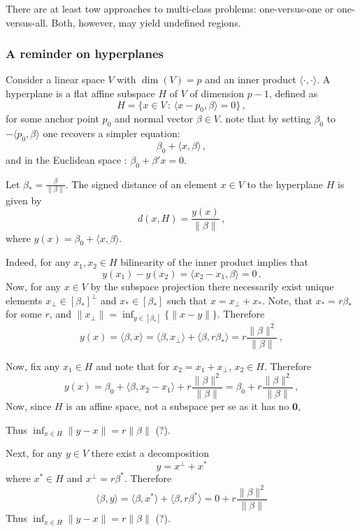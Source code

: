 \documentclass[a4paper]{article}
\begin{document}
There are at least tow approaches to multi-class problems: one-versus-one or one-
versus-all. Both, however, may yield undefined regions.

\subsubsection{A reminder on hyperplanes} %
\label{ssub:a_reminder_on_hyperplanes}
Consider a linear space $V$ with $\dim(V)=p$ and an inner product $\langle\cdot,\cdot\rangle$.
A hyperplane is a flat affine subspace $H$ of $V$ of dimension $p-1$, defined as
\[
H = \bigl\{x\in V\,:\, \langle x - p_0, \beta\rangle = 0 \bigr\}\,,
\]
for some anchor point $p_0$ and normal vector $\beta\in V$. note that by setting
$\beta_0$ to $-\langle p_0,\beta \rangle$ one recovers a simpler equation:
\[ \beta_0 + \langle x, \beta\rangle\,, \]
and in the Euclidean space : $\beta_0 + \beta'x = 0$.

Let $\beta_* = \frac{\beta}{\|\beta\|}$. The signed distance of an element $x\in V$
to the hyperplane $H$ is given by
\[ d(x, H) = \frac{y(x)}{\|\beta\|}\,, \]
where $y(x) = \beta_0 + \langle x, \beta\rangle$.

Indeed, for any $x_1, x_2\in H$ bilinearity of the inner product implies that
\[ y(x_1) - y(x_2) = \langle x_2-x_1, \beta\rangle = 0\,. \]
Now, for any $x\in V$ by the subspace projection there necessarily exist unique
elements $x_\perp\in [\beta_*]^\perp$ and $x_* \in [\beta_*]$ such that $x = x_\perp + x_*$.
Note, that $x_* = r\beta_*$ for some $r$, and $\|x_\perp\| = \inf_{y\in[\beta_*]}\{\|x-y\|\}$.
Therefore
\[
y(x)
= \langle \beta, x \rangle
= \langle \beta, x_\perp \rangle + \langle \beta, r \beta_* \rangle
= r \frac{\|\beta\|^2}{ \|\beta\| }\,,
\]


Now, fix any $x_1\in H$ and note that for $x_2 = x_1 + x_\perp$, $x_2\in H$. Therefore
\[
y(x)
= \beta_0 + \langle \beta, x_2-x_1 \rangle + r \frac{\|\beta\|^2}{ \|\beta\| }
= \beta_0 + r \frac{\|\beta\|^2}{ \|\beta\| } \,,
\]
Now, since $H$ is an affine space, not a subspace per se as it has no $\mathbf{0}$,

Thus $\inf_{x\in H}\|y-x\| = r\|\beta\|$ (?).


Next, for any $y\in V$ there exist a decomposition
\[ y = x^\perp + x^*\]
where $x^*\in H$ and $x^\perp = r\beta^*$. Therefore
\[
\langle\beta,y\rangle
= \langle\beta,x^*\rangle + \langle\beta,r\beta^*\rangle
= 0 + r \frac{\|\beta\|^2}{\|\beta\|}
\]
Thus $\inf_{x\in H}\|y-x\| = r\|\beta\|$ (?).
\end{document}
